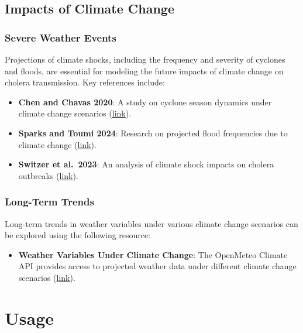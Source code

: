 \documentclass[
]{book}
\providecommand{\tightlist}{%
  \setlength{\itemsep}{0pt}\setlength{\parskip}{0pt}}
\begin{document}
\section{Impacts of Climate Change}\label{impacts-of-climate-change-1}

\subsection{Severe Weather Events}\label{severe-weather-events}

Projections of climate shocks, including the frequency and severity of cyclones and floods, are essential for modeling the future impacts of climate change on cholera transmission. Key references include:

\begin{itemize}
\tightlist
\item
  \textbf{Chen and Chavas 2020}: A study on cyclone season dynamics under climate change scenarios (\href{https://journals.ametsoc.org/view/journals/atsc/77/8/jasD190320.xml}{link}).
\item
  \textbf{Sparks and Toumi 2024}: Research on projected flood frequencies due to climate change (\href{https://www.nature.com/articles/s41597-024-03250-y}{link}).
\item
  \textbf{Switzer et al.~2023}: An analysis of climate shock impacts on cholera outbreaks (\href{https://www.nature.com/articles/s43247-023-00844-z}{link}).
\end{itemize}

\subsection{Long-Term Trends}\label{long-term-trends}

Long-term trends in weather variables under various climate change scenarios can be explored using the following resource:

\begin{itemize}
\tightlist
\item
  \textbf{Weather Variables Under Climate Change}: The OpenMeteo Climate API provides access to projected weather data under different climate change scenarios (\href{https://open-meteo.com/en/docs/climate-api}{link}).
\end{itemize}

\chapter{Usage}\label{usage}
\end{document}
